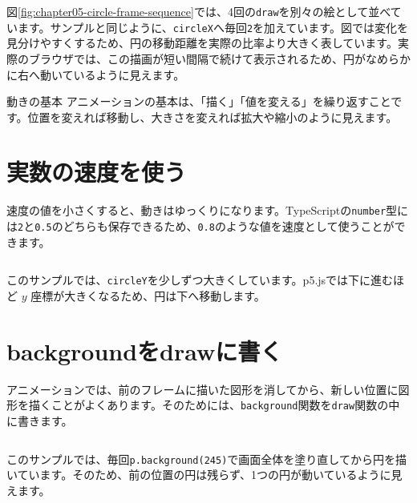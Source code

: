 図\ref{fig:chapter05-circle-frame-sequence}では、4回の\texttt{draw}を別々の絵として並べています。サンプルと同じように、\texttt{circleX}へ毎回\texttt{2}を加えています。図では変化を見分けやすくするため、円の移動距離を実際の比率より大きく表しています。実際のブラウザでは、この描画が短い間隔で続けて表示されるため、円がなめらかに右へ動いているように見えます。

\begin{pointbox}{動きの基本}
アニメーションの基本は、「描く」「値を変える」を繰り返すことです。位置を変えれば移動し、大きさを変えれば拡大や縮小のように見えます。
\end{pointbox}

\section{実数の速度を使う}

速度の値を小さくすると、動きはゆっくりになります。TypeScriptの\texttt{number}型には\texttt{2}と\texttt{0.5}のどちらも保存できるため、\texttt{0.8}のような値を速度として使うことができます。

\begin{listing}[htbp]
\inputminted{ts}{typescript-p5/listings/chapter05/fractional-speed.ts}
\caption{小数の速度で円をゆっくり動かす（\texttt{chapter05/fractional-speed.ts}）}
\label{lst:chapter05-fractional-speed}
\end{listing}

このサンプルでは、\texttt{circleY}を少しずつ大きくしています。p5.jsでは下に進むほど $y$ 座標が大きくなるため、円は下へ移動します。

\section{backgroundをdrawに書く}

アニメーションでは、前のフレームに描いた図形を消してから、新しい位置に図形を描くことがよくあります。そのためには、\texttt{background}関数を\texttt{draw}関数の中に書きます。

\begin{listing}[htbp]
\inputminted{ts}{typescript-p5/listings/chapter05/background-in-draw.ts}
\caption{drawの中で背景を塗り直す（\texttt{chapter05/background-in-draw.ts}）}
\label{lst:chapter05-background-in-draw}
\end{listing}

このサンプルでは、毎回\texttt{p.background(245)}で画面全体を塗り直してから円を描いています。そのため、前の位置の円は残らず、1つの円が動いているように見えます。

